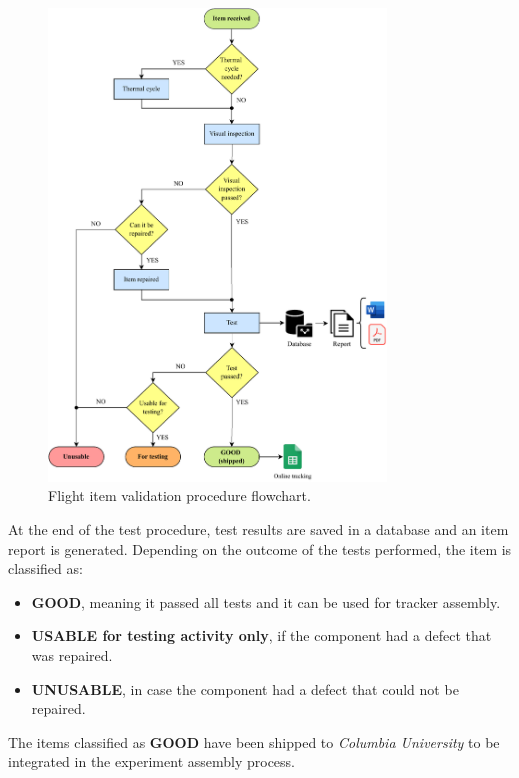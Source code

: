 \begin{figure}[h!]
    \centering
    \includegraphics[width=0.8\textwidth]{Images/chap2/flight_item_validation_procedure.drawio.pdf}
    \caption{Flight item validation procedure flowchart.}
    \label{figFlowChart}
\end{figure}

At the end of the test procedure, test results are saved in a database and an item report is generated. Depending on the outcome of the tests performed, the item is classified as:

\begin{itemize}
    \item \textbf{GOOD}, meaning it passed all tests and it can be used for tracker assembly.
    \item \textbf{USABLE for testing activity only}, if the component had a defect that was repaired.
    \item \textbf{UNUSABLE}, in case the component had a defect that could not be repaired.
\end{itemize}

\par
\noindent
The items classified as \textbf{GOOD} have been shipped to \textit{Columbia University} to be integrated in the experiment assembly process.


